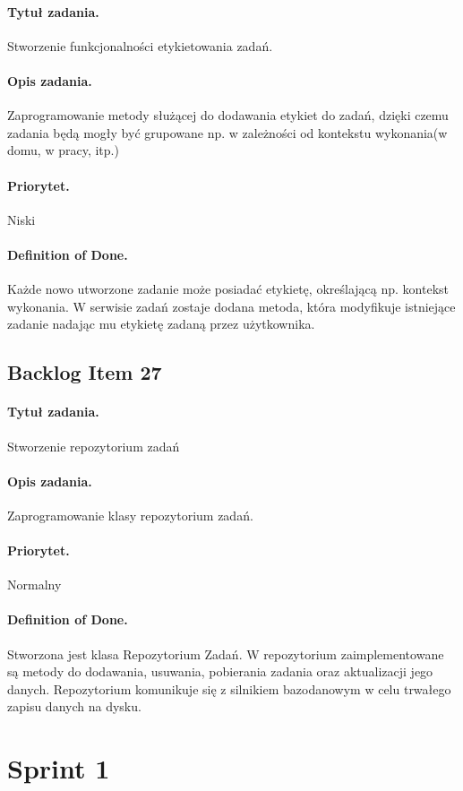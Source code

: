 \documentclass[a4paper]{article}
\begin{document}
\paragraph{Tytuł zadania.} Stworzenie funkcjonalności etykietowania zadań.
\paragraph{Opis zadania.} Zaprogramowanie metody służącej do dodawania etykiet do zadań, dzięki czemu zadania będą mogły być grupowane np. w zależności od kontekstu wykonania(w domu, w pracy, itp.)
\paragraph{Priorytet.} Niski
\paragraph{Definition of Done.} Każde nowo utworzone zadanie może posiadać etykietę, określającą np. kontekst wykonania. W serwisie zadań zostaje dodana metoda, która modyfikuje istniejące zadanie nadając mu etykietę zadaną przez użytkownika.

\subsection{Backlog Item 27} 
\paragraph{Tytuł zadania.} Stworzenie repozytorium zadań 
\paragraph{Opis zadania.} Zaprogramowanie klasy repozytorium zadań.
\paragraph{Priorytet.} Normalny
\paragraph{Definition of Done.} Stworzona jest klasa Repozytorium Zadań. W repozytorium zaimplementowane są metody do dodawania, usuwania, pobierania zadania  oraz aktualizacji jego danych. Repozytorium komunikuje się z silnikiem bazodanowym w celu trwałego zapisu danych na dysku.


\section{Sprint 1}
\end{document}
